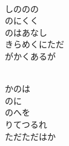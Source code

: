 \documentclass[10pt,b5j]{tarticle} %
\begin{document}
\begin{enumerate}
\begin{minipage}[c]{\blocksize}
        \vspace{\linespace}
        \item~\\
        しののの\\
        のにくく\\
        のはあなし\\
        きらめくにただ\\
        がかくあるが
        
        \vspace{\linespace}
        \item~\\
        かのは\\
        のに\\
        のへを\\
        りてつるれ\\
        ただただはか
    
    \end{minipage}
\end{enumerate} %
\end{document}
